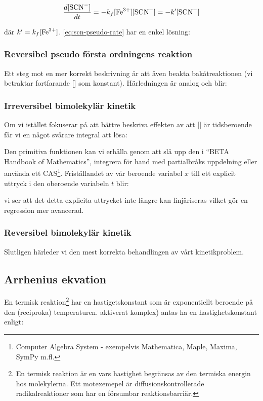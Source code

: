 \begin{equation}
  \label{eq:scn-pseudo-rate}
  \frac{d[\ce{SCN-}]}{dt} = -k_f[\ce{Fe^3+}][\ce{SCN-}] = -k'[\ce{SCN-}]
\end{equation}

där $k' = k_f[\ce{Fe^3+}]$. \cref{eq:scn-pseudo-rate} har en enkel lösning:



\subsubsection{Reversibel pseudo första ordningens reaktion}
\label{sec:rev_unary}
Ett steg mot en mer korrekt beskrivning är att även beakta
bakåtreaktionen (vi betraktar fortfarande [] som
konstant). Härledningen är analog och blir:




\subsubsection{Irreversibel bimolekylär kinetik}
\label{sec:irrev_binary}
Om vi istället fokuserar på att bättre beskriva effekten av att
[] är tidsberoende får vi en något svårare integral att lösa:



Den primitiva funktionen kan vi erhålla genom att slå upp den i ``BETA Handbook of
Mathematics'', integrera för hand med partialbråks 
uppdelning eller använda ett CAS\footnote{  Computer Algebra System -
  exempelvis Mathematica, Maple, Maxima, SymPy m.fl.}. Friställandet av
vår beroende variabel $x$ till ett explicit uttryck i den oberoende
variabeln $t$ blir:  



vi ser att det detta explicita uttrycket inte längre kan linjäriseras
vilket gör en regression mer avancerad.

\subsubsection{Reversibel bimolekylär kinetik}
Slutligen härleder vi den mest korrekta behandlingen av vårt kinetikproblem.
\label{sec:rev_binary}




\subsection{Arrhenius ekvation}
En termisk reaktion\footnote{En termisk reaktion är en vars hastighet begränsas av den termiska
energin hos molekylerna. Ett motexemepel är diffusionskontrollerade
radikalreaktioner som har en försumbar reaktionsbarriär.} har en
hastigetskonstant som är exponentiellt beroende på den (reciproka) temperaturen.
aktiverat komplex) antas ha en hastighetskonstant enligt:

